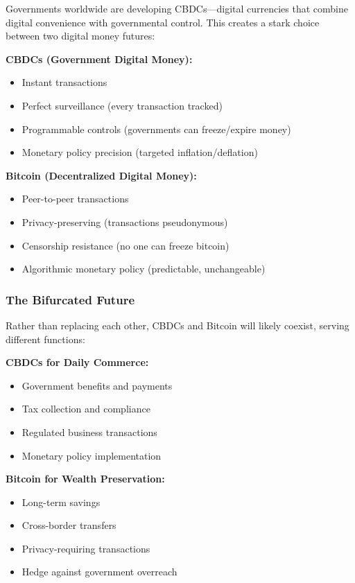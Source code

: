 \documentclass[11pt,oneside]{book}
\begin{document}
Governments worldwide are developing CBDCs—digital currencies that combine digital convenience with governmental control. This creates a stark choice between two digital money futures:

\textbf{CBDCs (Government Digital Money):}
\begin{itemize}
\item Instant transactions
\item Perfect surveillance (every transaction tracked)
\item Programmable controls (governments can freeze/expire money)
\item Monetary policy precision (targeted inflation/deflation)
\end{itemize}

\textbf{Bitcoin (Decentralized Digital Money):}
\begin{itemize}
\item Peer-to-peer transactions
\item Privacy-preserving (transactions pseudonymous)
\item Censorship resistance (no one can freeze bitcoin)
\item Algorithmic monetary policy (predictable, unchangeable)
\end{itemize}

\subsubsection{The Bifurcated Future}

Rather than replacing each other, CBDCs and Bitcoin will likely coexist, serving different functions:

\textbf{CBDCs for Daily Commerce:}
\begin{itemize}
\item Government benefits and payments
\item Tax collection and compliance
\item Regulated business transactions
\item Monetary policy implementation
\end{itemize}

\textbf{Bitcoin for Wealth Preservation:}
\begin{itemize}
\item Long-term savings
\item Cross-border transfers
\item Privacy-requiring transactions
\item Hedge against government overreach
\end{itemize}
\end{document}
